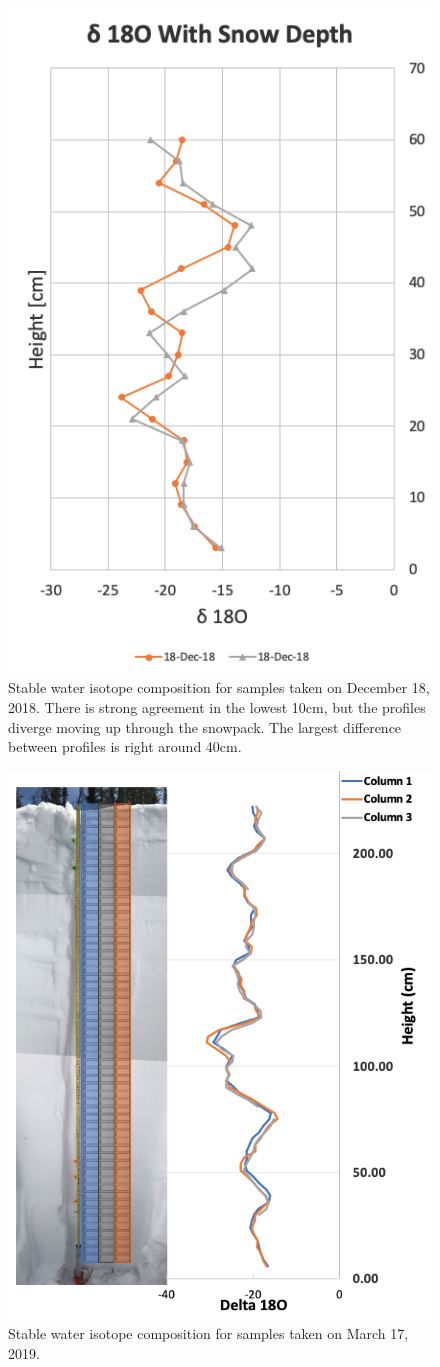 \begin{figure}[H]
    \centering
    \includegraphics[width=0.7\linewidth]{figures/Isotopes/Dec18_Isotopes.png}
    \caption{Stable water isotope composition for samples taken on December 18, 2018. There is strong agreement in the lowest 10cm, but the profiles diverge moving up through the snowpack. The largest difference between profiles is right around 40cm.}
    \label{fig:Dec18_Isotopes}
\end{figure}

\begin{figure}[H]
    \centering
    \includegraphics[width=0.7\linewidth]{figures/Isotopes/Mar17_Isotopes.png}
    \caption{Stable water isotope composition for samples taken on March 17, 2019.}
    \label{fig:Mar17_Isotopes}
\end{figure}

